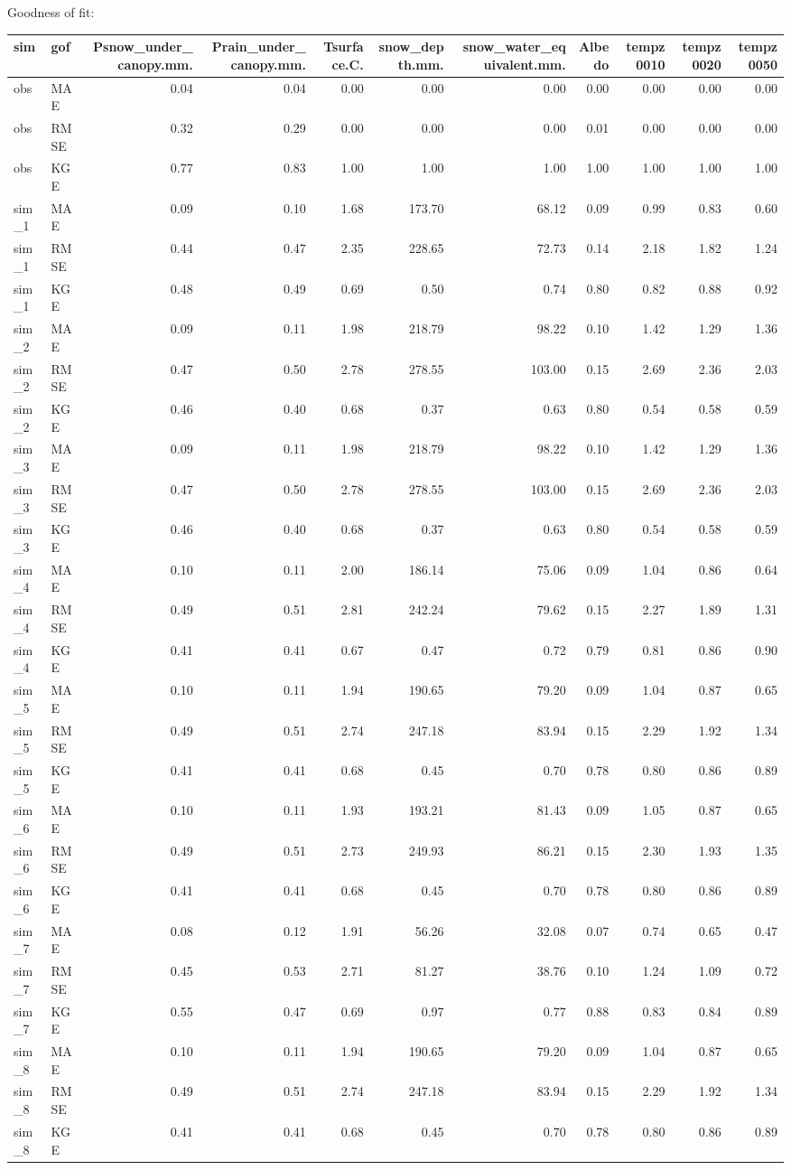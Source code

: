 \documentclass[
]{article}
\begin{document}
Goodness of fit:

\begin{longtable}[]{@{}llrrrrrrrrr@{}}
\toprule
sim & gof & Psnow\_under\_canopy.mm. & Prain\_under\_canopy.mm. &
Tsurface.C. & snow\_depth.mm. & snow\_water\_equivalent.mm. & Albedo &
tempz0010 & tempz0020 & tempz0050\tabularnewline
\midrule
\endhead
obs & MAE & 0.04 & 0.04 & 0.00 & 0.00 & 0.00 & 0.00 & 0.00 & 0.00 &
0.00\tabularnewline
obs & RMSE & 0.32 & 0.29 & 0.00 & 0.00 & 0.00 & 0.01 & 0.00 & 0.00 &
0.00\tabularnewline
obs & KGE & 0.77 & 0.83 & 1.00 & 1.00 & 1.00 & 1.00 & 1.00 & 1.00 &
1.00\tabularnewline
sim\_1 & MAE & 0.09 & 0.10 & 1.68 & 173.70 & 68.12 & 0.09 & 0.99 & 0.83
& 0.60\tabularnewline
sim\_1 & RMSE & 0.44 & 0.47 & 2.35 & 228.65 & 72.73 & 0.14 & 2.18 & 1.82
& 1.24\tabularnewline
sim\_1 & KGE & 0.48 & 0.49 & 0.69 & 0.50 & 0.74 & 0.80 & 0.82 & 0.88 &
0.92\tabularnewline
sim\_2 & MAE & 0.09 & 0.11 & 1.98 & 218.79 & 98.22 & 0.10 & 1.42 & 1.29
& 1.36\tabularnewline
sim\_2 & RMSE & 0.47 & 0.50 & 2.78 & 278.55 & 103.00 & 0.15 & 2.69 &
2.36 & 2.03\tabularnewline
sim\_2 & KGE & 0.46 & 0.40 & 0.68 & 0.37 & 0.63 & 0.80 & 0.54 & 0.58 &
0.59\tabularnewline
sim\_3 & MAE & 0.09 & 0.11 & 1.98 & 218.79 & 98.22 & 0.10 & 1.42 & 1.29
& 1.36\tabularnewline
sim\_3 & RMSE & 0.47 & 0.50 & 2.78 & 278.55 & 103.00 & 0.15 & 2.69 &
2.36 & 2.03\tabularnewline
sim\_3 & KGE & 0.46 & 0.40 & 0.68 & 0.37 & 0.63 & 0.80 & 0.54 & 0.58 &
0.59\tabularnewline
sim\_4 & MAE & 0.10 & 0.11 & 2.00 & 186.14 & 75.06 & 0.09 & 1.04 & 0.86
& 0.64\tabularnewline
sim\_4 & RMSE & 0.49 & 0.51 & 2.81 & 242.24 & 79.62 & 0.15 & 2.27 & 1.89
& 1.31\tabularnewline
sim\_4 & KGE & 0.41 & 0.41 & 0.67 & 0.47 & 0.72 & 0.79 & 0.81 & 0.86 &
0.90\tabularnewline
sim\_5 & MAE & 0.10 & 0.11 & 1.94 & 190.65 & 79.20 & 0.09 & 1.04 & 0.87
& 0.65\tabularnewline
sim\_5 & RMSE & 0.49 & 0.51 & 2.74 & 247.18 & 83.94 & 0.15 & 2.29 & 1.92
& 1.34\tabularnewline
sim\_5 & KGE & 0.41 & 0.41 & 0.68 & 0.45 & 0.70 & 0.78 & 0.80 & 0.86 &
0.89\tabularnewline
sim\_6 & MAE & 0.10 & 0.11 & 1.93 & 193.21 & 81.43 & 0.09 & 1.05 & 0.87
& 0.65\tabularnewline
sim\_6 & RMSE & 0.49 & 0.51 & 2.73 & 249.93 & 86.21 & 0.15 & 2.30 & 1.93
& 1.35\tabularnewline
sim\_6 & KGE & 0.41 & 0.41 & 0.68 & 0.45 & 0.70 & 0.78 & 0.80 & 0.86 &
0.89\tabularnewline
sim\_7 & MAE & 0.08 & 0.12 & 1.91 & 56.26 & 32.08 & 0.07 & 0.74 & 0.65 &
0.47\tabularnewline
sim\_7 & RMSE & 0.45 & 0.53 & 2.71 & 81.27 & 38.76 & 0.10 & 1.24 & 1.09
& 0.72\tabularnewline
sim\_7 & KGE & 0.55 & 0.47 & 0.69 & 0.97 & 0.77 & 0.88 & 0.83 & 0.84 &
0.89\tabularnewline
sim\_8 & MAE & 0.10 & 0.11 & 1.94 & 190.65 & 79.20 & 0.09 & 1.04 & 0.87
& 0.65\tabularnewline
sim\_8 & RMSE & 0.49 & 0.51 & 2.74 & 247.18 & 83.94 & 0.15 & 2.29 & 1.92
& 1.34\tabularnewline
sim\_8 & KGE & 0.41 & 0.41 & 0.68 & 0.45 & 0.70 & 0.78 & 0.80 & 0.86 &
0.89\tabularnewline
\bottomrule
\end{longtable}
\end{document}
